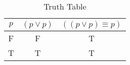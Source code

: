 \begin{table}[ht]
\caption{Truth Table}
\centering
\begin{tabular}{|c||c|c|}
\hline
$ p $ & $ (p \vee p) $ & $ ((p \vee p) \equiv p) $ \\
\hline
F & F & T \\
T & T & T \\
\hline
\end{tabular}
\label{table:tt1}
\end{table}
